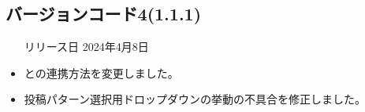 \subsection*{バージョンコード4(1.1.1)}
\begin{itemize}
    \item[リリース日] 2024年4月8日
\end{itemize}

\new \par
\change
\begin{itemize}
    \item \mi との連携方法を変更しました。
\end{itemize}

\fix
\begin{itemize}
    \item 投稿パターン選択用ドロップダウンの挙動の不具合を修正しました。
\end{itemize}